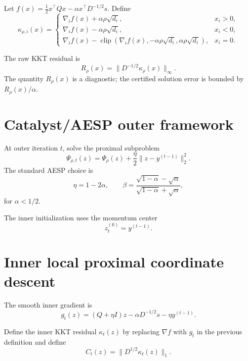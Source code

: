 \documentclass[11pt]{article}
\begin{document}
Let $f(x)=\frac12x^\top Qx-\alpha x^\top D^{-1/2}s$. Define
\begin{equation}
\kappa_{\rho,i}(x)=
\begin{cases}
\nabla_i f(x)+\alpha\rho\sqrt{d_i},&x_i>0,\\
\nabla_i f(x)-\alpha\rho\sqrt{d_i},&x_i<0,\\
\nabla_i f(x)-\operatorname{clip}(\nabla_i f(x),-\alpha\rho\sqrt{d_i},\alpha\rho\sqrt{d_i}),&x_i=0.
\end{cases}
\end{equation}

The raw KKT residual is
\begin{equation}
R_\rho(x)=\|D^{-1/2}\kappa_\rho(x)\|_\infty.
\end{equation}
The quantity $R_\rho(x)$ is a diagnostic; the certified solution error is bounded by $R_\rho(x)/\alpha$.

\section{Catalyst/AESP outer framework}

At outer iteration $t$, solve the proximal subproblem
\begin{equation}
\Psi_{\rho,t}(z)=\Psi_\rho(z)+\frac{\eta}{2}\|z-y^{(t-1)}\|_2^2.
\end{equation}
The standard AESP choice is
\begin{equation}
\eta=1-2\alpha,
\qquad
\beta=\frac{\sqrt{1-\alpha}-\sqrt\alpha}{\sqrt{1-\alpha}+\sqrt\alpha},
\end{equation}
for $\alpha<1/2$.

The inner initialization uses the momentum center
\begin{equation}
z^{(0)}_t=y^{(t-1)}.
\end{equation}

\section{Inner local proximal coordinate descent}

The smooth inner gradient is
\begin{equation}
g_t(z)=(Q+\eta I)z-\alpha D^{-1/2}s-\eta y^{(t-1)}.
\end{equation}

Define the inner KKT residual $\kappa_t(z)$ by replacing $\nabla f$ with $g_t$ in the previous definition and define
\begin{equation}
C_t(z)=\|D^{1/2}\kappa_t(z)\|_1.
\end{equation}
\end{document}
